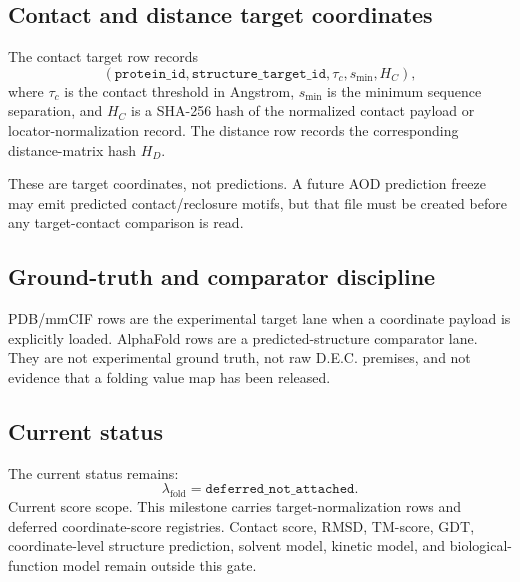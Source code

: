 \subsection{Contact and distance target coordinates}

The contact target row records
\[
(\texttt{protein\_id},\texttt{structure\_target\_id},\tau_c,s_{\min},H_C),
\]
where $\tau_c$ is the contact threshold in Angstrom, $s_{\min}$ is the minimum sequence separation, and $H_C$ is a SHA-256 hash of the normalized contact payload or locator-normalization record. The distance row records the corresponding distance-matrix hash $H_D$.

These are target coordinates, not predictions. A future AOD prediction freeze may emit predicted contact/reclosure motifs, but that file must be created before any target-contact comparison is read.

\subsection{Ground-truth and comparator discipline}

PDB/mmCIF rows are the experimental target lane when a coordinate payload is explicitly loaded. AlphaFold rows are a predicted-structure comparator lane. They are not experimental ground truth, not raw D.E.C. premises, and not evidence that a folding value map has been released.


\subsection{Current status}

The current status remains:
\[
\lambda_{\mathrm{fold}}=\texttt{deferred\_not\_attached}.
\]
Current score scope. This milestone carries target-normalization rows and deferred coordinate-score registries. Contact score, RMSD, TM-score, GDT, coordinate-level structure prediction, solvent model, kinetic model, and biological-function model remain outside this gate.
